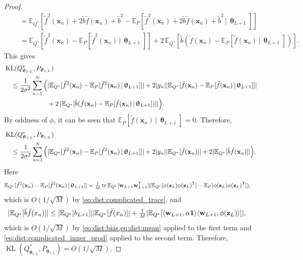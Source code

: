\documentclass[twoside]{article}
\renewcommand{\ss}[1]{_{\text{#1}}}
\newcommand{\vw}{\mathbf{w}}
\newcommand{\vx}{\mathbf{x}}
\newcommand{\vz}{\mathbf{z}}
\newcommand{\vtheta}{\bm{\uptheta}}
\newcommand{\vone}{\mathbf{1}}
\newcommand{\E}{\mathbb{E}}
\newcommand{\T}{\text{\textsf{T}}}
\newcommand{\opspace}{}
\newcommand{\KL}{\operatorname{KL}}
\newcommand{\tr}{\operatorname{tr}\opspace}
\newcommand{\cond}{\,|\,}                  %
\renewcommand{\ss}[1]{_{\text{#1}}}        %
\DeclarePairedDelimiter\lra{\langle}{\rangle}    %
\DeclarePairedDelimiter\norm{\|}{\|}             %
\DeclarePairedDelimiter\abs{|}{|}                %
\theoremstyle{theoremstyle}
\begin{document}
\begin{proof}
\begin{align}
        &\quad=
            \E_{Q^*}[
                \tilde f^2(\vx_n) + 2 \tilde b \tilde f(\vx_n) + \tilde b^2
                -\E_{P}[\tilde f^2(\vx_n) + 2 \tilde b \tilde f(\vx_n) + \tilde b^2\cond \vtheta_{L+1}]
            ] \\
        &\quad=
        \E_{Q^*}[
                \tilde f^2(\vx_n)
                -\E_{P}[\tilde f^2(\vx_n) \cond \vtheta_{L+1}]
            ]
        + 2\, \E_{Q^*}[\tilde b (\tilde f(\vx_n) - \E_P[\tilde f(\vx_n) \cond \vtheta_{L+1}])].
    \end{align}
    This gives
    \begin{align}
        &\KL(Q^*_{\vtheta_{1:L}}, P_{\vtheta_{1:L}}) \nonumber \\
        &\quad\le \frac1{2\sigma^2}\sum_{n=1}^N\Big(
            \abs{\E_{Q^*}[\tilde f^2(\vx_n) -\E_{P}[\tilde f^2(\vx_n)\cond \vtheta_{L+1}]]}
            + 2 \abs{y_n} \abs{\E_{Q^*}[\tilde f(\vx_n) -\E_{P}[\tilde f(\vx_n)\cond \vtheta_{L+1}]]} \nonumber \\
        &\hphantom{\quad\le \frac1{2\sigma^2}\sum_{n=1}^N\Big(}\; + 2\, \abs{\E_{Q^*}[\tilde b (\tilde f(\vx_n) - \E_P[\tilde f(\vx_n) \cond \vtheta_{L+1}])]} \Big).
    \end{align}
    By oddness of $\phi$, it can be seen that $\E_P[\tilde f(\vx_n) \cond \vtheta_{L+1}] = 0$.
    Therefore,
    \begin{align}
        &\KL(Q^*_{\vtheta_{1:L}}, P_{\vtheta_{1:L}}) \nonumber \\
        &\quad\le \frac1{2\sigma^2}\sum_{n=1}^N\Big(
            \abs{\E_{Q^*}[\tilde f^2(\vx_n) -\E_{P}[\tilde f^2(\vx_n)\cond \vtheta_{L+1}]]}
            + 2 \abs{y_n} \abs{\E_{Q^*}[\tilde f(\vx_n)]} + 2 \abs{\E_{Q^*}[\tilde b \tilde f(\vx_n)]} \Big).
    \end{align}
    Here
    \begin{align}
        \E_{Q^*}[\tilde f^2(\vx_n) -\E_{P}[\tilde f^2(\vx_n)\cond \vtheta_{L+1}]]
        &= \tfrac1M\tr \E_{Q^*}[\vw_{L+1} \vw_{L+1}^\T] (
            \E_{Q^*}[\phi(\vz_L) \phi(\vz_L)^\T]
            - \E_{P}[\phi(\vz_L) \phi(\vz_L)^\T]
        ), 
    \end{align}
    which is $O(1/\sqrt{M})$ by \cref{eq:dist:complicated_trace}, and
    \begin{align}
        \abs{\E_{Q^*}[\tilde b \tilde f(x_n)]}
        &\le
            \abs{\E_{Q^*}[b_{L+1}]} \abs{\E_{Q^*}[\tilde f(x_n)]}
            + \tfrac1{M}\abs{\E_{Q^*}[\lra{\vw_{L+1}, \alpha \vone} \lra{\vw_{L+1}, \phi(\vz_{L})}]},
    \end{align}
    which is $O(1/\sqrt{M})$ by \cref{eq:dist:bias,eq:dist:mean} applied to the first term and \cref{eq:dist:complicated_inner_prod} applied to the second term. Therefore, $\KL(Q^*_{\vtheta_{1:L}}, P_{\vtheta_{1:L}}) = O(1/\sqrt{M})$.
    

\end{proof}
\end{document}

